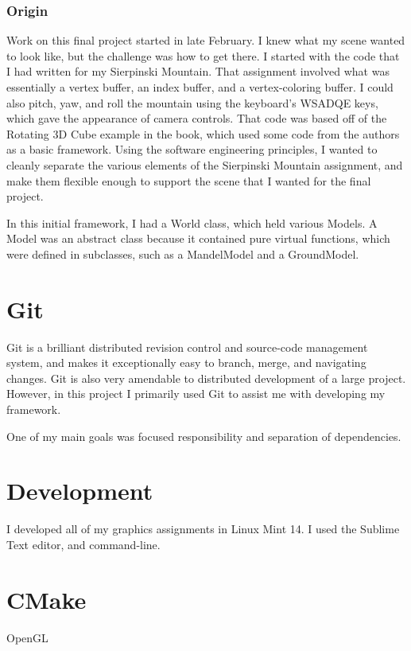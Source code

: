 \documentclass[journal]{IEEEtran}
\begin{document}
\subsubsection{Origin}

Work on this final project started in late February. I knew what my scene wanted to look like, but the challenge was how to get there. I started with the code that I had written for my Sierpinski Mountain. That assignment involved what was essentially a vertex buffer, an index buffer, and a vertex-coloring buffer. I could also pitch, yaw, and roll the mountain using the keyboard's WSADQE keys, which gave the appearance of camera controls. That code was based off of the Rotating 3D Cube example in the book, which used some code from the authors as a basic framework. Using the software engineering principles, I wanted to cleanly separate the various elements of the Sierpinski Mountain assignment, and make them flexible enough to support the scene that I wanted for the final project.

In this initial framework, I had a World class, which held various Models. A Model was an abstract class because it contained pure virtual functions, which were defined in subclasses, such as a MandelModel and a GroundModel.

\section{Git}

Git is a brilliant distributed revision control and source-code management system, and makes it exceptionally easy to branch, merge, and navigating changes. Git is also very amendable to distributed development of a large project. However, in this project I primarily used Git to assist me with developing my framework.

One of my main goals was focused responsibility and separation of dependencies.

\section{Development}

I developed all of my graphics assignments in Linux Mint 14. I used the Sublime Text editor, and command-line.

\section{CMake}
OpenGL
\end{document}

